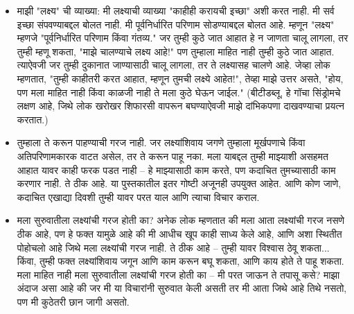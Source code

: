 \begin{itemize}
\item माझी "लक्ष्य" ची व्याख्या: मी लक्ष्याची व्याख्या "काहीही करायची इच्छा" अशी करत नाही. मी सर्व इच्छा संपवण्याबद्दल बोलत नाही. मी पूर्वनिर्धारित परिणाम सोडण्याबद्दल बोलत आहे. म्हणून "लक्ष्य" म्हणजे "पूर्वनिर्धारित परिणाम किंवा गंतव्य." जर तुम्ही कुठे जात आहात हे न जाणता चालू लागला, तर तुम्ही म्हणू शकता, "माझे चालण्याचे लक्ष्य आहे!" पण तुम्हाला माहित नाही तुम्ही कुठे जात आहात. त्याऐवजी जर तुम्ही दुकानात जाण्यासाठी चालू लागला, तर ते लक्ष्यासह चालणे आहे. जेव्हा लोक म्हणतात, "तुम्ही काहीतरी करत आहात, म्हणून तुमची लक्ष्ये आहेत!", तेव्हा माझे उत्तर असते, "होय, पण मला माहित नाही किंवा काळजी नाही ते मला कुठे घेऊन जाईल." (बीटीडब्लू, हे गॉचा सिंड्रोमचे लक्षण आहे, जिथे लोक खरोखर शिफारसी वापरून बघण्याऐवजी माझे दांभिकपणा दाखवण्याचा प्रयत्न करतात.)
\item तुम्हाला ते करून पाहण्याची गरज नाही. जर लक्ष्यांशिवाय जगणे तुम्हाला मूर्खपणाचे किंवा अतिपरिणामकारक वाटत असेल, तर ते करून पाहू नका. मला याबद्दल तुम्ही माझ्याशी असहमत आहात यावर काही फरक पडत नाही -- हे माझ्यासाठी काम करते, पण कदाचित तुमच्यासाठी काम करणार नाही. ते ठीक आहे. या पुस्तकातील इतर गोष्टी अजूनही उपयुक्त आहेत. आणि कोण जाणे, कदाचित एखाद्या दिवशी तुम्ही यावर परत याल आणि त्याचा विचार कराल.
\item मला सुरुवातीला लक्ष्यांची गरज होती का? अनेक लोक म्हणतात की मला आता लक्ष्यांची गरज नसणे ठीक आहे, पण हे फक्त यामुळे आहे की मी आधीच खूप काही साध्य केले आहे, आणि अशा स्थितीत पोहोचलो आहे जिथे मला लक्ष्यांची गरज नाही. ते ठीक आहे -- तुम्ही यावर विश्वास ठेवू शकता... किंवा, तुम्ही फक्त लक्ष्यांशिवाय जगून आणि काम करून बघू शकता, आणि काय होते ते पाहू शकता. मला माहित नाही मला सुरुवातीला लक्ष्यांची गरज होती का -- मी परत जाऊन ते तपासू कसे? माझा अंदाज असा आहे की जर मी या विचारांनी सुरुवात केली असती तर मी आता जिथे आहे तिथे नसतो, पण मी कुठेतरी छान जागी असतो.
\end{itemize}

